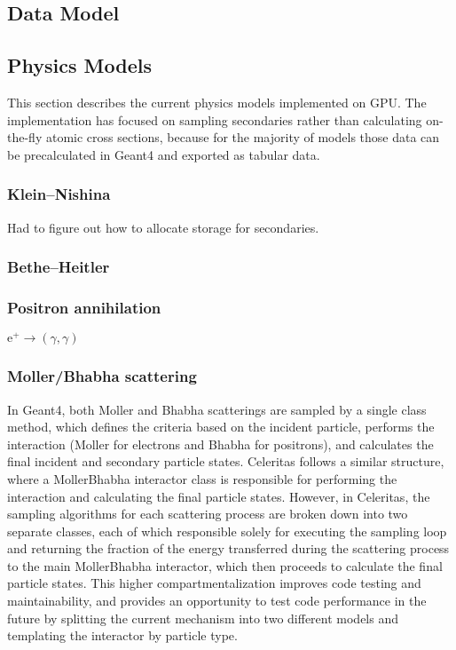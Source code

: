 \documentclass{webofc}
\begin{document}
\subsection{Data Model}
\label{sec:data-model}

\subsection{Physics Models}
\label{sec:physics-models}

This section describes the current physics models implemented on GPU. The
implementation has focused on sampling secondaries rather than calculating
on-the-fly atomic cross sections, because for the majority of models those data
can be precalculated in Geant4 and exported as tabular data.

\subsubsection{Klein--Nishina}

Had to figure out how to allocate storage for secondaries.

\subsubsection{Bethe--Heitler}


\subsubsection{Positron annihilation}

$\textrm{e}^+ \to (\gamma, \gamma)$

\subsubsection{Moller/Bhabha scattering}

In Geant4, both Moller and Bhabha scatterings are sampled by a single
class method, which defines the criteria based on the incident particle,
performs the interaction (Moller for electrons and Bhabha for positrons), and
calculates the final incident and secondary particle states. Celeritas
follows a similar structure, where a MollerBhabha interactor class is
responsible for performing the interaction and calculating the final particle
states. However, in Celeritas, the sampling algorithms for each scattering
process are broken down into two separate classes, each of which responsible
solely for executing the sampling loop and returning the fraction of the energy
transferred during the scattering process to the main MollerBhabha interactor,
which then proceeds to calculate the final particle states. This higher
compartmentalization improves code testing and maintainability, and provides
an opportunity to test code performance in the future by splitting the current
mechanism into two different models and templating the interactor by particle
type.
\end{document}
